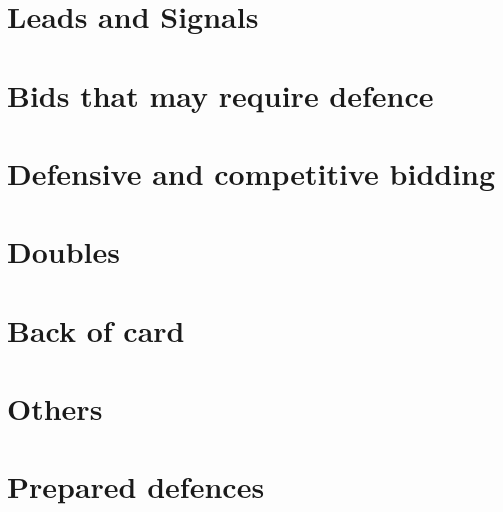 \documentclass{article}
\newcommand{\+}{\textsuperscript{+}}
\begin{document}
\section{Leads and Signals}
\section{Bids that may require defence}
\section{Defensive and competitive bidding}
\section{Doubles}
\section{Back of card}
\section{Others}
\section{Prepared defences}
\end{document}
